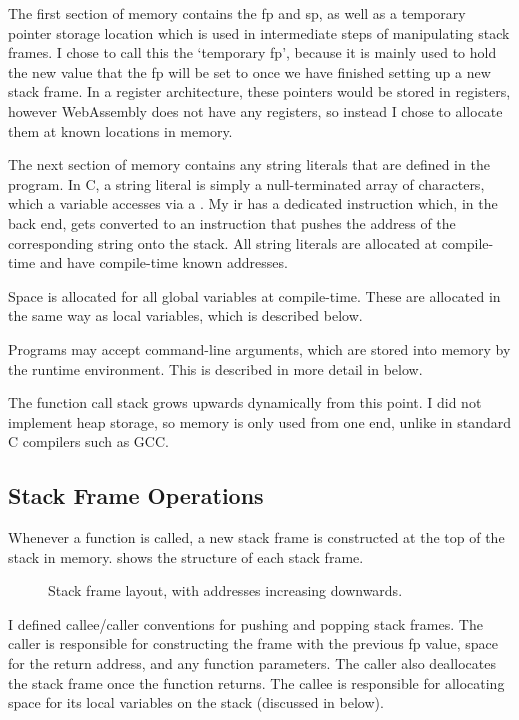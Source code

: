 \documentclass[00-main.tex]{subfiles}
\begin{document}
The first section of memory contains the \gls{fp} and \gls{sp}, as well as a temporary pointer storage location which is used in intermediate steps of manipulating stack frames.
I chose to call this the `temporary \gls{fp}', because it is mainly used to hold the new value that the \gls{fp} will be set to once we have finished setting up a new stack frame.
In a register architecture, these pointers would be stored in registers, however WebAssembly does not have any registers, so instead I chose to allocate them at known locations in memory.

The next section of memory contains any string literals that are defined in the program.
In C, a string literal is simply a null-terminated array of characters, which a variable accesses via a .
My \gls{ir} has a dedicated  instruction which, in the back end, gets converted to an instruction that pushes the address of the corresponding string onto the stack.
All string literals are allocated at compile-time and have compile-time known addresses.

Space is allocated for all global variables at compile-time.
These are allocated in the same way as local variables, which is described below.

Programs may accept command-line arguments, which are stored into memory by the runtime environment.
This is described in more detail in  below.

The function call stack grows upwards dynamically from this point.
I did not implement heap storage, so memory is only used from one end, unlike in standard C compilers such as GCC.

\subsection{Stack Frame Operations}

Whenever a function is called, a new stack frame is constructed at the top of the stack in memory.
 shows the structure of each stack frame.

\begin{figure}[ht]
  \centering
  \caption{Stack frame layout, with addresses increasing downwards.}
  \label{fig:stack frame layout}
\end{figure}

I defined callee/caller conventions for pushing and popping stack frames.
The caller is responsible for constructing the frame with the previous \gls{fp} value, space for the return address, and any function parameters.
The caller also deallocates the stack frame once the function returns.
The callee is responsible for allocating space for its local variables on the stack (discussed in  below).
\end{document}
